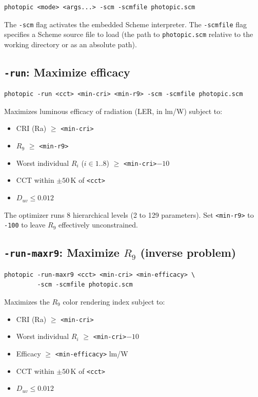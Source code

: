 \documentclass[11pt]{article}
\newcommand{\cmd}[1]{\texttt{#1}}
\newcommand{\file}[1]{\texttt{#1}}
\begin{document}
\begin{lstlisting}[style=shell]
photopic <mode> <args...> -scm -scmfile photopic.scm
\end{lstlisting}

The \cmd{-scm} flag activates the embedded Scheme interpreter.
The \cmd{-scmfile} flag specifies a Scheme source file to load (the path
to \file{photopic.scm} relative to the working directory or as an
absolute path).

\subsection{\texttt{-run}: Maximize efficacy}

\begin{lstlisting}[style=shell]
photopic -run <cct> <min-cri> <min-r9> -scm -scmfile photopic.scm
\end{lstlisting}

Maximizes luminous efficacy of radiation (LER, in lm/W) subject to:
\begin{itemize}
  \item CRI (Ra) $\geq$ \cmd{<min-cri>}
  \item $R_9$ $\geq$ \cmd{<min-r9>}
  \item Worst individual $R_i$ ($i \in 1..8$) $\geq$ \cmd{<min-cri>}$-10$
  \item CCT within $\pm50$\,K of \cmd{<cct>}
  \item $D_{uv} \leq 0.012$
\end{itemize}

The optimizer runs 8 hierarchical levels (2 to 129 parameters).
Set \cmd{<min-r9>} to \cmd{-100} to leave $R_9$ effectively unconstrained.

\subsection{\texttt{-run-maxr9}: Maximize \texorpdfstring{$R_9$}{R9} (inverse problem)}

\begin{lstlisting}[style=shell]
photopic -run-maxr9 <cct> <min-cri> <min-efficacy> \
         -scm -scmfile photopic.scm
\end{lstlisting}

Maximizes the $R_9$ color rendering index subject to:
\begin{itemize}
  \item CRI (Ra) $\geq$ \cmd{<min-cri>}
  \item Worst individual $R_i$ $\geq$ \cmd{<min-cri>}$-10$
  \item Efficacy $\geq$ \cmd{<min-efficacy>} lm/W
  \item CCT within $\pm50$\,K of \cmd{<cct>}
  \item $D_{uv} \leq 0.012$
\end{itemize}
\end{document}
